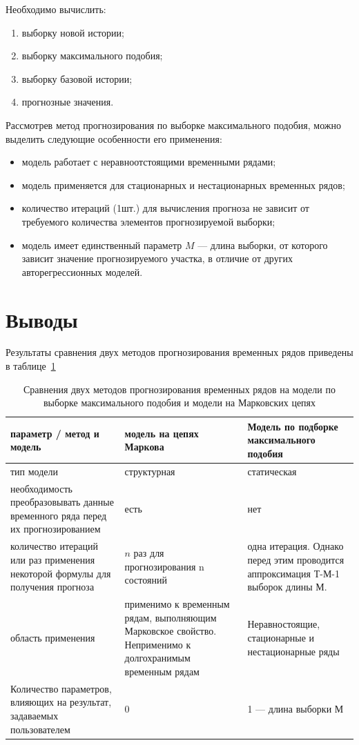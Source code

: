 Необходимо вычислить:
\begin{enumerate}
    \item выборку новой истории;
    \item выборку максимального подобия;
    \item выборку базовой истории;
    \item прогнозные значения.
\end{enumerate}

Рассмотрев метод прогнозирования по выборке максимального подобия, можно выделить следующие особенности его применения:

\begin{itemize}
    \item модель работает с неравноотстоящими временными рядами;
    \item модель применяется для стационарных и нестационарных временных рядов;
    \item количество итераций (1шт.) для вычисления прогноза не зависит от требуемого количества элементов прогнозируемой выборки;
    \item модель имеет единственный параметр $M$ --- длина выборки, от которого зависит значение прогнозируемого участка, в отличие от других авторегрессионных моделей.
\end{itemize}

\section{Выводы}

Результаты сравнения двух методов прогнозирования временных
рядов приведены в таблице~\ref{tab_prog}

\begin{table}[h!]
    \caption{Сравнения двух методов прогнозирования временных рядов на модели по выборке максимального подобия и модели на Марковских цепях}
    \label{tab_prog}
    \centering
    \begin{tabular}{||p{5cm}|p{5cm}|p{5cm}||}
        \hline
        параметр / метод и модель & модель на цепях Маркова & Модель по подборке максимального подобия\\
        \hline \hline
        {тип модели} & структурная & статическая \\
        \hline
        {необходимость преобразовывать данные временного ряда перед их прогнозированием} & есть & нет\\
        \hline
        {количество итераций или раз применения некоторой формулы для получения прогноза} & $n$ раз для прогнозирования n состояний & одна итерация. Однако перед этим проводится аппроксимация Т-М-1 выборок длины М. \\
        \hline
        {область применения} &  {применимо к временным рядам, выполняющим Марковское свойство. Неприменимо к долгохранимым временным рядам} & Неравностоящие, стационарные и нестационарные ряды \\
        \hline
        {Количество параметров, влияющих на результат, задаваемых пользователем} & 0 & 1 --- длина выборки М \\
        \hline \hline
    \end{tabular}
\end{table}
\clearpage

